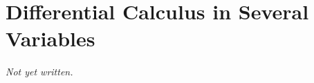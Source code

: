 \chapter{Differential Calculus in Several Variables}\label{ch:differential-calculus-several-variables}


\textit{Not yet written.}
